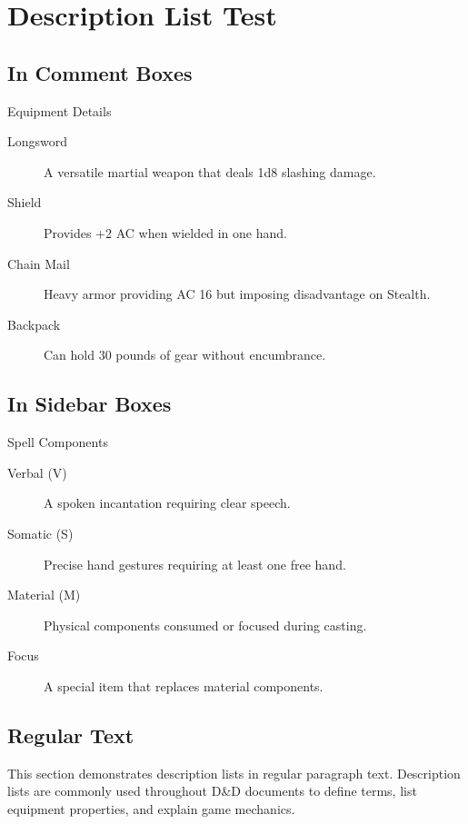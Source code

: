 \documentclass[fonts=wotc, bg=none, nooutline, letterpaper,twocolumn]{dndbook}
\begin{document}
\chapter{Description List Test}

\section{In Comment Boxes}

\begin{DndComment}{Equipment Details}
  \begin{description}
    \item[Longsword] A versatile martial weapon that deals 1d8 slashing damage.
    \item[Shield] Provides +2 AC when wielded in one hand.
    \item[Chain Mail] Heavy armor providing AC 16 but imposing disadvantage on Stealth.
    \item[Backpack] Can hold 30 pounds of gear without encumbrance.
  \end{description}
\end{DndComment}

\section{In Sidebar Boxes}

\begin{DndSidebar}{Spell Components}
  \begin{description}
    \item[Verbal (V)] A spoken incantation requiring clear speech.
    \item[Somatic (S)] Precise hand gestures requiring at least one free hand.
    \item[Material (M)] Physical components consumed or focused during casting.
    \item[Focus] A special item that replaces material components.
  \end{description}
\end{DndSidebar}

\section{Regular Text}

This section demonstrates description lists in regular paragraph text. Description lists are commonly used throughout D\&D documents to define terms, list equipment properties, and explain game mechanics.
\end{document}
